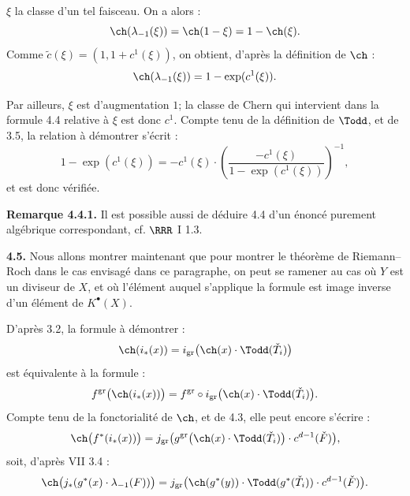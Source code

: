 
\(\xi\) la classe d'un tel faisceau. On a alors :
\[
 \ch(\lambda_{-1}(\xi))=\ch(1-\xi)=1-\ch(\xi).
\]
Comme \(\widetilde c(\xi)=(1,1+c^1(\xi))\), on obtient, d'après la définition de \(\ch\) :
\[
 \ch(\lambda_{-1}(\xi))=1-\exp(c^1(\xi)).
\]

Par ailleurs, \(\xi\) est d'augmentation \(1\); la classe de Chern qui intervient dans la formule 4.4 relative à \(\xi\) est donc \(c^1\). Compte tenu de la définition de \(\Todd\), et de 3.5, la relation à démontrer s'écrit :
\[
 1-\exp(c^1(\xi))
 =
 -c^1(\xi)\cdot\left(\frac{-c^1(\xi)}{1-\exp(c^1(\xi))}\right)^{-1},
\]
et est donc vérifiée.

\textbf{Remarque 4.4.1.} Il est possible aussi de déduire 4.4 d'un énoncé purement algébrique correspondant, cf. \(\RRR\) I 1.3.

\textbf{4.5.} Nous allons montrer maintenant que pour montrer le théorème de Riemann--Roch dans le cas envisagé dans ce paragraphe, on peut se ramener au cas où \(Y\) est un diviseur de \(X\), et où l'élément auquel s'applique la formule est image inverse d'un élément de \(K^{\bullet}(X)\).

D'après 3.2, la formule à démontrer :
\[
 \ch(i_*(x))=
 i_{\mathrm{gr}}\bigl(\ch(x)\cdot\Todd(\check T_i)\bigr)
\]
est équivalente à la formule :
\[
 f^{\mathrm{gr}}\bigl(\ch(i_*(x))\bigr)
 =
 f^{\mathrm{gr}}\circ i_{\mathrm{gr}}\bigl(\ch(x)\cdot\Todd(\check T_i)\bigr).
\]
Compte tenu de la fonctorialité de \(\ch\), et de 4.3, elle peut encore s'écrire :
\[
 \ch\bigl(f^*(i_*(x))\bigr)
 =
 j_{\mathrm{gr}}\bigl(g^{\mathrm{gr}}\bigl(\ch(x)\cdot\Todd(\check T_i)\bigr)\cdot c^{d-1}(\check F)\bigr),
\]
soit, d'après VII 3.4 :
\[
 \ch\bigl(j_*(g^*(x)\cdot\lambda_{-1}(F))\bigr)
 =
 j_{\mathrm{gr}}\bigl(\ch(g^*(y))\cdot\Todd(g^*(\check T_i))\cdot c^{d-1}(\check F)\bigr).
\]

